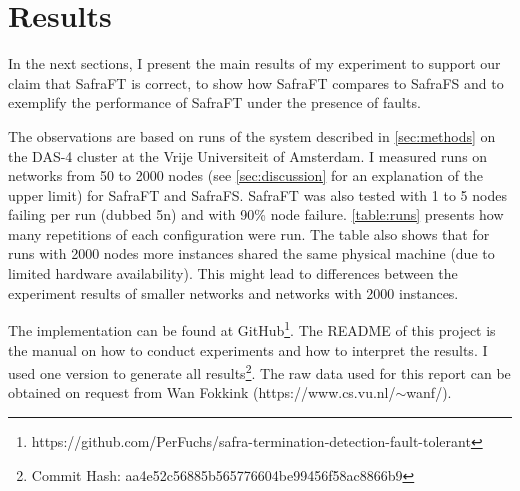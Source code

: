 \section{Results}
\label{sec:results}
In the next sections, I present the main results of my experiment to support our claim that SafraFT is correct, to show how SafraFT compares to SafraFS and to exemplify the performance of SafraFT under the presence of faults.

The observations are based on runs of the system described in \cref{sec:methods} on the DAS-4 cluster at the Vrije Universiteit of Amsterdam.
I measured runs on networks from 50 to 2000 nodes (see \cref{sec:discussion} for an explanation of the upper limit) for SafraFT and SafraFS.
SafraFT was also tested with 1 to 5 nodes failing per run (dubbed 5n) and with 90\% node failure.
\cref{table:runs} presents how many repetitions of each configuration were run.
The table also shows that for runs with 2000 nodes more instances shared the same physical machine (due to limited hardware availability).
This might lead to differences between the experiment results of smaller networks and networks with 2000 instances.

The implementation can be found at GitHub\footnote{https://github.com/PerFuchs/safra-termination-detection-fault-tolerant}.
The README of this project is the manual on how to conduct experiments and how to interpret the results.
I used one version to generate all results\footnote{Commit Hash: aa4e52c56885b565776604be99456f58ac8866b9}.
The raw data used for this report can be obtained on request from Wan Fokkink (https://www.cs.vu.nl/$\sim$wanf/).

